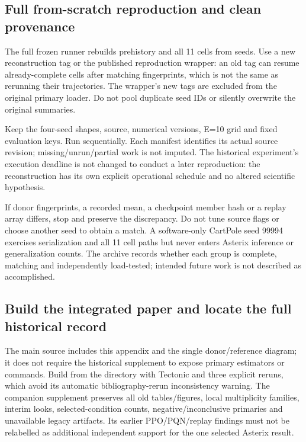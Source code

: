 \subsection{Full from-scratch reproduction and clean provenance}
The full frozen runner rebuilds prehistory and all 11 cells from seeds. Use a new reconstruction tag or the published reproduction wrapper: an old tag can resume already-complete cells after matching fingerprints, which is not the same as rerunning their trajectories. The wrapper's new tags are excluded from the original primary loader. Do not pool duplicate seed IDs or silently overwrite the original summaries.

Keep the four-seed shapes, source, numerical versions, E=10 grid and fixed evaluation keys. Run sequentially. Each manifest identifies its actual source revision; missing/unrun/partial work is not imputed. The historical experiment's execution deadline is not changed to conduct a later reproduction: the reconstruction has its own explicit operational schedule and no altered scientific hypothesis.

If donor fingerprints, a recorded mean, a checkpoint member hash or a replay array differs, stop and preserve the discrepancy. Do not tune source flags or choose another seed to obtain a match. A software-only CartPole seed 99994 exercises serialization and all 11 cell paths but never enters Asterix inference or generalization counts. The archive records whether each group is complete, matching and independently load-tested; intended future work is not described as accomplished.

\subsection{Build the integrated paper and locate the full historical record}
The main source includes this appendix and the single donor/reference diagram; it does not require the historical supplement to expose primary estimators or commands. Build from the  directory with Tectonic and three explicit reruns, which avoid its automatic bibliography-rerun inconsistency warning. The companion supplement preserves all old tables/figures, local multiplicity families, interim looks, selected-condition counts, negative/inconclusive primaries and unavailable legacy artifacts. Its earlier PPO/PQN/replay findings must not be relabelled as additional independent support for the one selected Asterix result.
